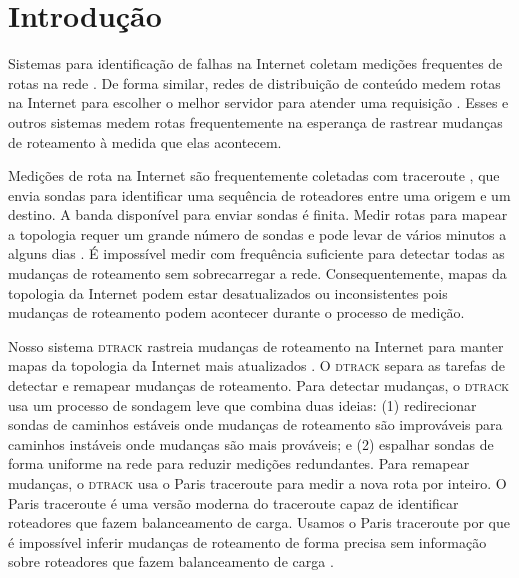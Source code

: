 \documentclass{JBCS}
\newcommand{\dtrack}{\textsc{dtrack}}
\begin{document}

\setcounter{footnote}{0}

\section{Introdução}
\label{sec:intro}

Sistemas para identificação de falhas na Internet coletam medições
frequentes de rotas na rede \cite{duffield06binary,
dhamdhere07netdiagnoser, kompella07blackholes, bassett12lifeguard}.  De
forma similar, redes de distribuição de conteúdo medem rotas na Internet
para escolher o melhor servidor para atender uma requisição
\cite{akamai}.  Esses e outros sistemas medem rotas frequentemente na
esperança de rastrear mudanças de roteamento à medida que elas
acontecem.  

Medições de rota na Internet são frequentemente coletadas com traceroute
\cite{jacobson1989traceroute, augustin07, veitch09balancer}, que envia
sondas para identificar uma sequência de roteadores entre uma origem e
um destino.  A banda disponível para enviar sondas é finita.  Medir
rotas para mapear a topologia requer um grande número de sondas e pode
levar de vários minutos a alguns dias \cite{cunha11fastmapping,
sherwood08discarte, skitter}.  É impossível medir com frequência
suficiente para detectar todas as mudanças de roteamento sem
sobrecarregar a rede.  Consequentemente, mapas da topologia da Internet
podem estar desatualizados ou inconsistentes pois mudanças de roteamento
podem acontecer durante o processo de medição.

Nosso sistema \dtrack{} rastreia mudanças de roteamento na Internet para
manter mapas da topologia da Internet mais atualizados
\cite{cunha11dtrack}.  O \dtrack{} separa as tarefas de detectar e
remapear mudanças de roteamento.  Para detectar mudanças, o \dtrack{}
usa um processo de sondagem leve que combina duas ideias: (1)
redirecionar sondas de caminhos estáveis onde mudanças de roteamento são
improváveis para caminhos instáveis onde mudanças são mais prováveis; e
(2) espalhar sondas de forma uniforme na rede para reduzir medições
redundantes.  Para remapear mudanças, o \dtrack{} usa o Paris traceroute
\cite{augustin07, veitch09balancer} para medir a nova rota por inteiro.
O Paris traceroute é uma versão moderna do traceroute capaz de
identificar roteadores que fazem balanceamento de carga.  Usamos o Paris
traceroute por que é impossível inferir mudanças de roteamento de forma
precisa sem informação sobre roteadores que fazem balanceamento de carga
\cite{cunha11fastmapping}.
\end{document}
